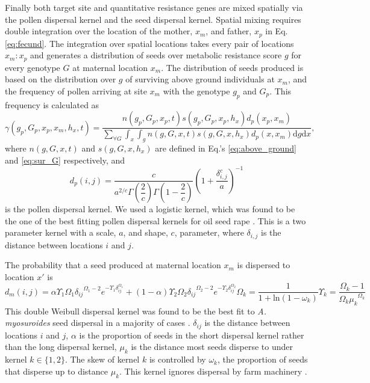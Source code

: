 \documentclass[10pt,letterpaper]{article}
\begin{document}
Finally both target site and quantitative resistance genes are mixed spatially via the pollen dispersal kernel and the seed dispersal kernel. Spatial mixing requires double integration over the location of the mother, $x_m$, and father, $x_p$ in Eq. \ref{eq:fecund}. The integration over spatial locations takes every pair of locations $x_m:x_p$ and generates a distribution of seeds over metabolic resistance score $g$ for every genotype $G$ at maternal location $x_m$. The distribution of seeds produced is based on the distribution over $g$ of surviving above ground individuals at $x_m$, and the frequency of pollen arriving at site $x_m$ with the genotype $g_p$ and $G_p$. This frequency is calculated as
\begin{equation}\label{eq:pollen_func}
\gamma(g_p, G_p, x_p, x_m, h_x, t) = \frac{n(g_p, G_p, x_p, t)
s(g_p, G_p, x_p, h_x) d_p(x_p, x_m)} {\sum_{\forall G}\int_{x}\int_{g} n(g, G, x, t) s(g, G, x, h_x) d_p(x, x_m) \text{d}g\text{d}x}, 
\end{equation}
where $n(g, G, x, t)$ and $s(g, G, x, h_x)$ are defined in Eq.'s \ref{eq:above_ground} and \ref{eq:sur_G} respectively, and 
\begin{equation}\label{eq:pollen_disp}
	d_p(i, j) = \frac{c}{a^{2/c}\Gamma\left(\dfrac{2}{c} \right)\Gamma\left(1 - \dfrac{2}{c} \right)}{\left( 1 + \dfrac{\delta_{i,j}^c}{a} \right)}^{-1} 
\end{equation} 
is the pollen dispersal kernel. We used a logistic kernel, which was found to be the one of the best fitting pollen dispersal kernels for oil seed rape \cite{Klei2006}. This is a two parameter kernel with a scale, $a$, and shape, $c$, parameter, where $\delta_{i,j}$ is the distance between locations $i$ and $j$. 

The probability that a seed produced at maternal location $x_m$ is dispersed to location $x'$ is 
\begin{subequations}\label{eq:seed_disp}
\begin{equation}\label{eq:seed_kern}
	d_m(i, j) = {\alpha \Upsilon_1 \Omega_1 \delta_{ij}}^{\Omega_1 - 2} e^{-\Upsilon_1 \delta_{ij}^{\Omega_1}} + {(1 - \alpha) \Upsilon_2 \Omega_2 \delta_{ij}}^{\Omega_2 - 2} e^{-\Upsilon_2 \delta_{ij}^{\Omega_2}}  
\end{equation}
\begin{equation}\label{eq:shape}
	\Omega_k = \frac{1}{1 + \text{ln}(1 - \omega_k)}
\end{equation}
\begin{equation}\label{eq:scale}
	\Upsilon_k = \frac{\Omega_k - 1}{{\Omega_k \mu_k}^{\Omega_k}}
\end{equation}
\end{subequations} 
This double Weibull dispersal kernel was found to be the best fit to \textit{A. myosuroides} seed dispersal in a majority of cases \cite{Colb2001}. $\delta_{ij}$ is the distance between locations $i$ and $j$, $\alpha$ is the proportion of seeds in the short dispersal kernel rather than the long dispersal kernel, $\mu_k$ is the distance most seeds disperse to under kernel $k \in \{1, 2\}$. The skew of kernel $k$ is controlled by $\omega_k$, the proportion of seeds that disperse up to distance $\mu_k$. This kernel ignores dispersal by farm machinery \cite{Colb2001}.
\end{document}
